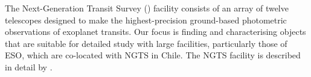 The Next-Generation Transit Survey (\ngts) facility consists of an array of twelve telescopes designed to make the highest-precision ground-based photometric observations of exoplanet transits.  Our focus is finding and characterising objects that are suitable for detailed study with large facilities, particularly those of ESO, which are co-located with NGTS in Chile. The NGTS facility is described in detail by \citet{2018MNRAS.475.4476W}.